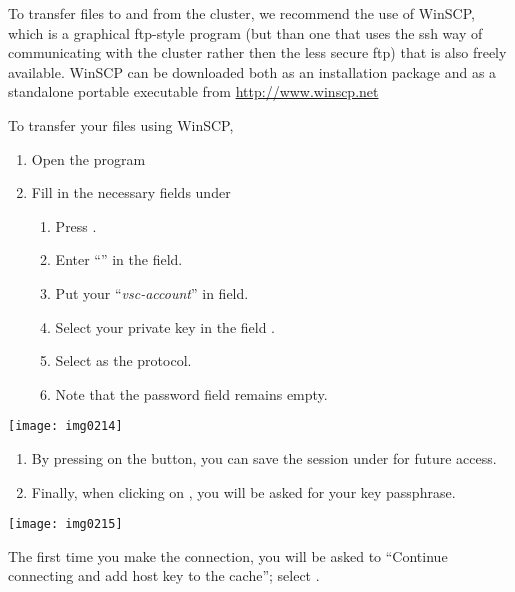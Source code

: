   To transfer files to and from the cluster, we recommend the use of WinSCP,
  which is a graphical ftp-style program (but than one that uses the ssh way of
  communicating with the cluster rather then the less secure ftp) that is also
  freely available. WinSCP can be downloaded both as an installation package
  and as a standalone portable executable from \url{http://www.winscp.net}

  To transfer your files using WinSCP,

  \begin{enumerate}
  \item  Open the program
  \item  Fill in the necessary fields under 
  \begin{enumerate}
  \item  Press .
  \item  Enter ``\emph{\loginnode}'' in the  field.
  \item  Put your ``\emph{vsc-account}'' in  field.
  \item  Select your private key in the field .
  \item  Select  as the  protocol.
  \item  Note that the password field remains empty.
  \end{enumerate}
  \end{enumerate}

  \begin{center}
  \texttt{[image: img0214]}
  \end{center}

  \begin{enumerate}
  \item  By pressing on the  button, you can save the session under
          for future access.
  \item  Finally, when clicking on , you will be asked for your key passphrase.
  \end{enumerate}

  \begin{center}
  \texttt{[image: img0215]}
  \end{center}

  The first time you make the connection, you will be asked to ``Continue
  connecting and add host key to the cache''; select .

